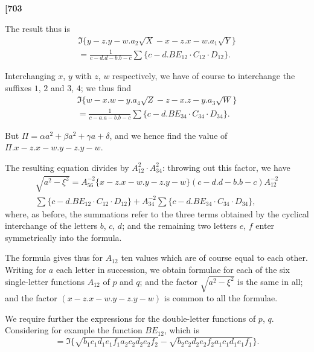 \documentclass[11pt,a4paper]{book}
\begin{document}
\noindent\textbf{[703}

\vspace{0.5em}

The result thus is
\begin{multline*}
\Im\{y - z . y - w . a_2 \sqrt{X} - x - z . x - w . a_1 \sqrt{Y}\} \\
= \frac{1}{c - d . d - b . b - c} \sum\{c - d . BE_{12} \cdot C_{12} \cdot D_{12}\}.
\end{multline*}

Interchanging $x$, $y$ with $z$, $w$ respectively, we have of course to interchange the suffixes $1$, $2$ and $3$, $4$; we thus find
\begin{multline*}
\Im\{w - x . w - y . a_4 \sqrt{Z} - z - x . z - y . a_3 \sqrt{W}\} \\
= \frac{1}{c - a . a - b . b - c} \sum\{c - d . BE_{34} \cdot C_{34} \cdot D_{34}\}.
\end{multline*}

But $\Pi = \alpha a^2 + \beta a^2 + \gamma a + \delta$, and we hence find the value of $\Pi . x - z . x - w . y - z . y - w$.

The resulting equation divides by $A_{12}^2 \cdot A_{34}^2$: throwing out this factor, we have
\begin{multline*}
\sqrt{a^2 - \xi^2} = A_{56}^{-2} \{x - z . x - w . y - z . y - w\}(c - d . d - b . b - c) A_{12}^{-2} \\
\sum\{c - d . BE_{12} \cdot C_{12} \cdot D_{12}\} + A_{34}^{-2} \sum\{c - d . BE_{34} \cdot C_{34} \cdot D_{34}\},
\end{multline*}
where, as before, the summations refer to the three terms obtained by the cyclical interchange of the letters $b$, $c$, $d$; and the remaining two letters $e$, $f$ enter symmetrically into the formula.

The formula gives thus for $A_{12}$ ten values which are of course equal to each other. Writing for $a$ each letter in succession, we obtain formulae for each of the six single-letter functions $A_{12}$ of $p$ and $q$; and the factor $\sqrt{a^2 - \xi^2}$ is the same in all; and the factor $(x - z . x - w . y - z . y - w)$ is common to all the formulae.

We require further the expressions for the double-letter functions of $p$, $q$. Considering for example the function $BE_{12}$, which is
\[
= \Im\{\sqrt{b_1 c_1 d_1 e_1 f_1 a_2 c_2 d_2 e_2 f_2} - \sqrt{b_2 c_2 d_2 e_2 f_2 a_1 c_1 d_1 e_1 f_1}\}.
\]

\vspace{1em}
\end{document}
